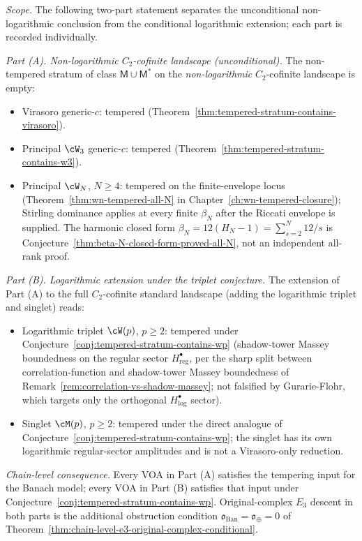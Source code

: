 \begin{corollary}
\label{cor:wp-dichotomy-healed}
\emph{Scope.} The following two-part statement separates the
unconditional non-logarithmic conclusion from the conditional
logarithmic extension; each part is recorded
individually.

\emph{Part (A). Non-logarithmic $C_2$-cofinite landscape
(unconditional).}
The non-tempered stratum of class $\mathsf{M} \cup \mathsf{M}^*$ on
the \emph{non-logarithmic} $C_2$-cofinite landscape is empty:
\begin{itemize}[nosep]
\item Virasoro generic-$c$: tempered
 (Theorem~\ref{thm:tempered-stratum-contains-virasoro}).
\item Principal $\cW_3$ generic-$c$: tempered
 (Theorem~\ref{thm:tempered-stratum-contains-w3}).
\item Principal $\cW_N$, $N \ge 4$: tempered on the finite-envelope
 locus
 (Theorem~\ref{thm:wn-tempered-all-N} in
 Chapter~\ref{ch:wn-tempered-closure}); Stirling dominance applies at
 every finite $\beta_N$ after the Riccati envelope is supplied. The
 harmonic closed form
 $\beta_N = 12(H_N - 1) = \sum_{s=2}^{N} 12/s$ is
 Conjecture~\ref{thm:beta-N-closed-form-proved-all-N}, not an
 independent all-rank proof.
\end{itemize}

\emph{Part (B). Logarithmic extension under the triplet conjecture.}
The extension of Part (A) to the full $C_2$-cofinite standard
landscape (adding the logarithmic triplet and singlet) reads:
\begin{itemize}[nosep]
\item Logarithmic triplet $\cW(p)$, $p \ge 2$: tempered under
 Conjecture~\ref{conj:tempered-stratum-contains-wp} (shadow-tower
 Massey boundedness on the regular sector $H^\bullet_{\mathrm{reg}}$,
 per the sharp split between correlation-function and shadow-tower
 Massey boundedness of
 Remark~\ref{rem:correlation-vs-shadow-massey}; not falsified by
 Gurarie-Flohr, which targets only the orthogonal
 $H^\bullet_{\mathrm{log}}$ sector).
\item Singlet $\cM(p)$, $p \ge 2$: tempered under the direct
 analogue of Conjecture~\ref{conj:tempered-stratum-contains-wp}; the
 singlet has its own logarithmic regular-sector amplitudes and is not
 a Virasoro-only reduction.
\end{itemize}

\emph{Chain-level consequence.} Every VOA in Part (A) satisfies the
tempering input for the Banach model; every VOA in Part (B) satisfies
that input under Conjecture~\ref{conj:tempered-stratum-contains-wp}.
Original-complex $E_3$ descent in both parts is the additional
obstruction condition
$\mathfrak{o}_{\mathrm{Ban}}=\mathfrak{o}_{\oplus}=0$ of
Theorem~\ref{thm:chain-level-e3-original-complex-conditional}.
\end{corollary}

